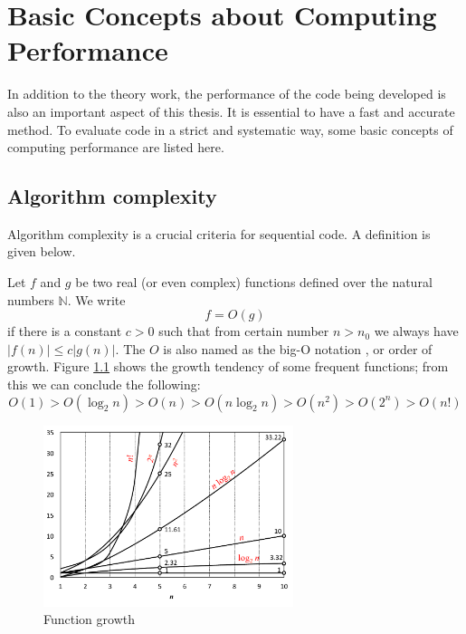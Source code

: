 
\chapter{Basic Concepts about Computing Performance\label{chpt:computing-performance}}

In addition to the theory work, the performance of the code being
developed is also an important aspect of this thesis. It is essential
to have a fast and accurate method. To evaluate code in a strict and
systematic way, some basic concepts of computing performance are listed
here. 


\section{Algorithm complexity}

Algorithm complexity is a crucial criteria for sequential code. A
definition is given below.

Let $f$ and $g$ be two real (or even complex) functions defined
over the natural numbers $\mathbb{N}$. We write
\begin{equation}
f=O(g)
\end{equation}
if there is a constant $c>0$ such that from certain number $n>n_{0}$
we always have $\left|f(n)\right|\leq c\left|g(n)\right|.$ The $O$
is also named as the big-O notation \citep{Complexity}, or order
of growth. Figure \ref{fig:order-of-growth} shows the growth tendency
of some frequent functions; from this we can conclude the following:
\begin{equation}
O(1)>O(\log_{2}n)>O(n)>O(n\log_{2}n)>O(n^{2})>O(2^{n})>O(n!)
\end{equation}


\begin{figure}[h]
\begin{centering}
\includegraphics[width=0.65\textwidth]{_figure/orders-of-growth}
\par\end{centering}

\caption{Function growth\label{fig:order-of-growth}}
\end{figure}


